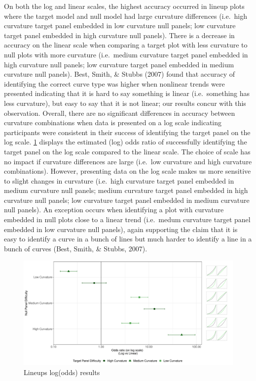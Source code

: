 \documentclass[print]{nuthesis}
\begin{document}
On both the log and linear scales, the highest accuracy occurred in lineup plots where the target model and null model had large curvature differences (i.e.~high curvature target panel embedded in low curvature null panels; low curvature target panel embedded in high curvature null panels).
There is a decrease in accuracy on the linear scale when comparing a target plot with less curvature to null plots with more curvature (i.e.~medium curvature target panel embedded in high curvature null panels; low curvature target panel embedded in medium curvature null panels).
Best, Smith, \& Stubbs (2007) found that accuracy of identifying the correct curve type was higher when nonlinear trends were presented indicating that it is hard to say something is linear (i.e.~something has less curvature), but easy to say that it is not linear; our results concur with this observation.
Overall, there are no significant differences in accuracy between curvature combinations when data is presented on a log scale indicating participants were consistent in their success of identifying the target panel on the log scale.
\cref{fig:odds-ratio-plot} displays the estimated (log) odds ratio of successfully identifying the target panel on the log scale compared to the linear scale.
The choice of scale has no impact if curvature differences are large (i.e.~low curvature and high curvature combinations).
However, presenting data on the log scale makes us more sensitive to slight changes in curvature (i.e.~high curvature target panel embedded in medium curvature null panels; medium curvature target panel embedded in high curvature null panels; low curvature target panel embedded in medium curvature null panels).
An exception occurs when identifying a plot with curvature embedded in null plots close to a linear trend (i.e.~medum curvature target panel embedded in low curvature null panels), again supporting the claim that it is easy to identify a curve in a bunch of lines but much harder to identify a line in a bunch of curves (Best, Smith, \& Stubbs, 2007).

\begin{figure}[tbp]

{\centering \includegraphics[width=\linewidth,]{thesis_files/figure-latex/odds-ratio-plot-1} 

}

\caption{Lineups log(odds) results}\label{fig:odds-ratio-plot}
\end{figure}
\end{document}
